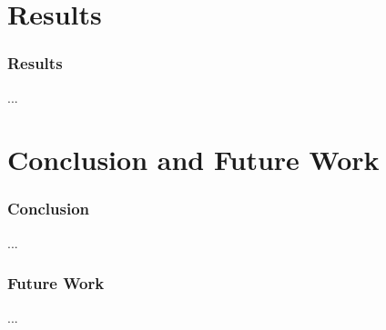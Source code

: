 \section{Results}

\begin{frame}
\frametitle{Results}

...

\end{frame}


\section{Conclusion and Future Work}

\begin{frame}
\frametitle{Conclusion}

...

\end{frame}

\begin{frame}
\frametitle{Future Work}

...

\end{frame}

